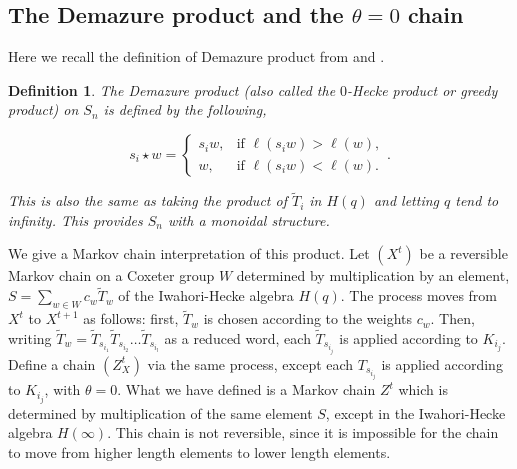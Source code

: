 \documentclass[11pt]{article}
\theoremstyle{plain}  %
\newtheorem{definition}[theorem]{Definition}
\begin{document}




\subsection{The Demazure product and the \texorpdfstring{$\theta=0$}{theta=0} chain}
\label{sec:demazure}

Here we recall the definition of Demazure product from \cite{li2024demazure} and \cite{Norton_1979} .
\begin{definition} \label{def:zerohecke} The Demazure product (also called the $0$-Hecke product or greedy product) on $S_n$ is defined by the following,

\[
 s_i \star  w =
\begin{cases}
s_i w, & \text{if } \ell(s_i w) > \ell(w),\\
w, & \text{if } \ell(s_i w) < \ell(w).
\end{cases}.
\]

This is also the same as taking the product of $\tilde T_i$ in $H(q)$ and letting $q$ tend to infinity. This provides $S_n$ with a monoidal structure. 
\end{definition}

We give a Markov chain interpretation of this product. Let $(X^t)$ be a reversible Markov chain on a Coxeter group $W$ determined by multiplication by an element, $S = \sum_{w \in W} c_w\tilde T_w$ of the Iwahori-Hecke algebra $H(q)$. The process moves from $X^t$ to $X^{t+1}$ as follows: first, $\tilde T_w$ is chosen according to the weights $c_w$. Then, writing $\tilde T_w = \tilde T_{s_{i_1}}\tilde T_{s_{i_2}}\ldots \tilde T_{s_{i_l}}$ as a reduced word, each $\tilde T_{s_{i_j}}$ is applied according to $K_{i_j}$. Define a chain $(Z^t_X)$ via the same process, except each $T_{s_{i_j}}$ is applied according to $K_{i_j}$, with $\theta = 0$. What we have defined is a Markov chain $Z^t$ which is determined by multiplication of the same element $S$, except in the Iwahori-Hecke algebra $H(\infty)$. This chain is not reversible, since it is impossible for the chain to move from higher length elements to lower length elements. 
\end{document}
